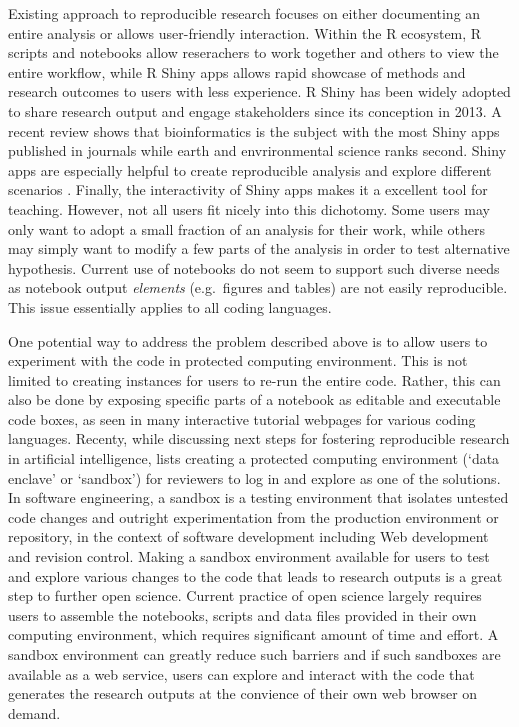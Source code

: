 Existing approach to reproducible research focuses on either documenting
an entire analysis or allows user-friendly interaction. Within the R
ecosystem, R scripts and notebooks allow reserachers to work together
and others to view the entire workflow, while R Shiny apps \citep{shiny}
allows rapid showcase of methods and research outcomes to users with
less experience. R Shiny has been widely adopted to share research
output and engage stakeholders since its conception in 2013. A recent
review \citep{Kasprzak} shows that bioinformatics is the subject with
the most Shiny apps published in journals while earth and envrironmental
science ranks second. Shiny apps are especially helpful to create
reproducible analysis \citep[e.g.~examples in][]{Hollaway2020} and
explore different scenarios \citep[e.g.][]{Whateley2015, Mose2018}.
Finally, the interactivity of Shiny apps makes it a excellent tool for
teaching\citep[e.g.][]{Williams2017, adventr}. However, not all users
fit nicely into this dichotomy. Some users may only want to adopt a
small fraction of an analysis for their work, while others may simply
want to modify a few parts of the analysis in order to test alternative
hypothesis. Current use of notebooks do not seem to support such diverse
needs as notebook output \emph{elements} (e.g.~figures and tables) are
not easily reproducible. This issue essentially applies to all coding
languages.

One potential way to address the problem described above is to allow
users to experiment with the code in protected computing environment.
This is not limited to creating instances for users to re-run the entire
code. Rather, this can also be done by exposing specific parts of a
notebook as editable and executable code boxes, as seen in many
interactive tutorial webpages for various coding languages. Recenty,
while discussing next steps for fostering reproducible research in
artificial intelligence, \citet{Carter2019} lists creating a protected
computing environment (`data enclave' or `sandbox') for reviewers to log
in and explore as one of the solutions. In software engineering, a
sandbox is a testing environment that isolates untested code changes and
outright experimentation from the production environment or repository,
in the context of software development including Web development and
revision control. Making a sandbox environment available for users to
test and explore various changes to the code that leads to research
outputs is a great step to further open science. Current practice of
open science largely requires users to assemble the notebooks, scripts
and data files provided in their own computing environment, which
requires significant amount of time and effort. A sandbox environment
can greatly reduce such barriers and if such sandboxes are available as
a web service, users can explore and interact with the code that
generates the research outputs at the convience of their own web browser
on demand.

